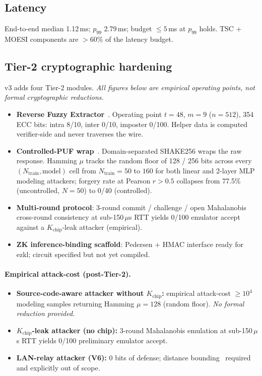 \documentclass[11pt,letterpaper]{article}
\begin{document}
\subsection{Latency}
End-to-end median 1.12\,ms; $p_{99}$ 2.79\,ms; budget $\leq 5$\,ms at
$p_{99}$ holds. TSC + MOESI components are $>60\%$ of the latency budget.

\subsection{Tier-2 cryptographic hardening}
\label{sec:tier2}
v3 adds four Tier-2 modules. \emph{All figures below are empirical
operating points, not formal cryptographic reductions.}
\begin{itemize}[noitemsep,topsep=2pt]
\item \textbf{Reverse Fuzzy Extractor}~\cite{VanHerrewege2012,Dodis2008,Boyen2004}.
      Operating point $t=48$, $m=9$ ($n=512$), 354 ECC bits: intra
      8/10, inter 0/10, imposter 0/100. Helper data is computed
      verifier-side and never traverses the wire.
\item \textbf{Controlled-PUF wrap}~\cite{Suh2007,Ruhrmair2010}.
      Domain-separated SHAKE256 wraps the raw response. Hamming $\mu$
      tracks the random floor of 128 / 256 bits across every
      $(N_{\text{train}}, \text{model})$ cell from
      $N_{\text{train}} = 50$ to $160$ for both linear and 2-layer MLP
      modeling attackers; forgery rate at Pearson $r > 0.5$ collapses
      from 77.5\% (uncontrolled, $N=50$) to 0/40 (controlled).
\item \textbf{Multi-round protocol}: 3-round commit / challenge / open
      Mahalanobis cross-round consistency at sub-150\,$\mu$s RTT yields
      0/100 emulator accept against a $K_{\text{chip}}$-leak attacker
      (empirical).
\item \textbf{ZK inference-binding scaffold}: Pedersen + HMAC interface
      ready for ezkl; circuit specified but not yet compiled.
\end{itemize}

\paragraph{Empirical attack-cost (post-Tier-2).}
\begin{itemize}[noitemsep,topsep=2pt]
\item \textbf{Source-code-aware attacker without $K_{\text{chip}}$:}
      empirical attack-cost $\geq 10^4$ modeling samples returning
      Hamming $\mu = 128$ (random floor). \emph{No formal reduction
      provided.}
\item \textbf{$K_{\text{chip}}$-leak attacker (no chip):}
      3-round Mahalanobis emulation at sub-150\,$\mu$s RTT yields 0/100
      preliminary emulator accept.
\item \textbf{LAN-relay attacker (V6):} 0 bits of defense; distance
      bounding~\cite{Brands1993} required and explicitly out of scope.
\end{itemize}
\end{document}
